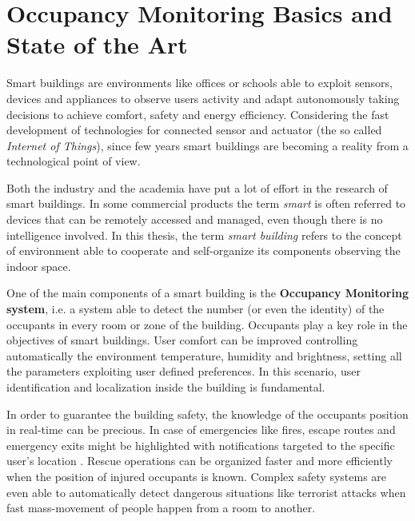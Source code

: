 %
%
\chapter[Occupancy Monitoring and State of the Art]{Occupancy Monitoring Basics and State of the Art}
%
%
\label{cap:soa}
%

Smart buildings are environments like offices or schools able to exploit sensors, devices and appliances to observe users activity and adapt autonomously taking decisions to achieve comfort, safety and energy efficiency. Considering the fast development of technologies for connected sensor and actuator (the so called \emph{Internet of Things}), since few years smart buildings are becoming a reality from a technological point of view.

Both the industry and the academia have put a lot of effort in the research of smart buildings. In some commercial products the term \emph{smart} is often referred to devices that can be remotely accessed and managed, even though there is no intelligence involved. In this thesis, the term \emph{smart building} refers to the concept of environment able to cooperate and self-organize its components observing the indoor space.

\medskip
One of the main components of a smart building is the \textbf{Occupancy Monitoring system}, i.e. a system able to detect the number (or even the identity) of the occupants in every room or zone of the building. Occupants play a key role in the objectives of smart buildings. User comfort can be improved controlling automatically the environment temperature, humidity and brightness, setting all the parameters exploiting user defined preferences. In this scenario, user identification and localization inside the building is fundamental. 

\smallskip
In order to guarantee the building safety, the knowledge of the occupants position in real-time can be precious. In case of emergencies like fires, escape routes and emergency exits might be highlighted with notifications targeted to the specific user's location \cite{Piscitello2015}. Rescue operations can be organized faster and more efficiently when the position of injured occupants is known. Complex safety systems are even able to automatically detect dangerous situations like terrorist attacks when fast mass-movement of people happen from a room to another.

